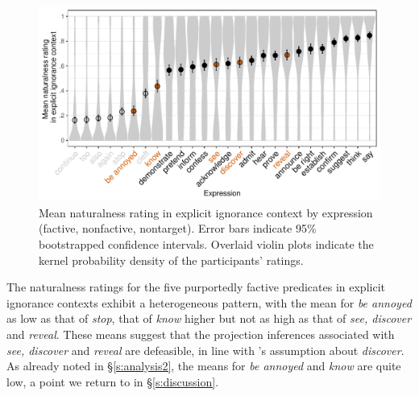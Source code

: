 \documentclass[11pt,fleqn]{article}
\newcommand{\6}{\mbox{$[\hspace*{-.6mm}[$}}
\newcommand{\9}{\mbox{$]\hspace*{-.6mm}]$}}
\newcommand{\citepos}[1]{\citeauthor{#1}'s \citeyear{#1}}
\begin{document}
\begin{figure}[h!]
\centering
\includegraphics[width=.9\textwidth]{../../../results/main/graphs/explicit-ignorance-naturalness-by-predicate}
\caption{Mean naturalness rating in explicit ignorance context by expression (\color{orange}factive\color{black}, \color{black}nonfactive\color{black}, \color{gray}nontarget\color{black}). Error bars indicate 95\% bootstrapped confidence intervals. Overlaid violin plots indicate the kernel probability density of the participants' ratings.}\label{fig:acc-by-expression}
\end{figure}

The naturalness ratings for the five purportedly factive predicates in explicit ignorance contexts exhibit a heterogeneous pattern, with the mean for \emph{be annoyed} as low as that of \emph{stop}, that of \emph{know} higher but not as high as that of \emph{see, discover} and \emph{reveal}. These means suggest that the projection inferences associated with \emph{see, discover} and \emph{reveal} are defeasible, in line with \citepos{simons01} assumption about \emph{discover}. As already noted in \S\ref{s:analysis2}, the means for \emph{be annoyed} and \emph{know} are quite low, a point we return to in \S\ref{s:discussion}.
\end{document}
